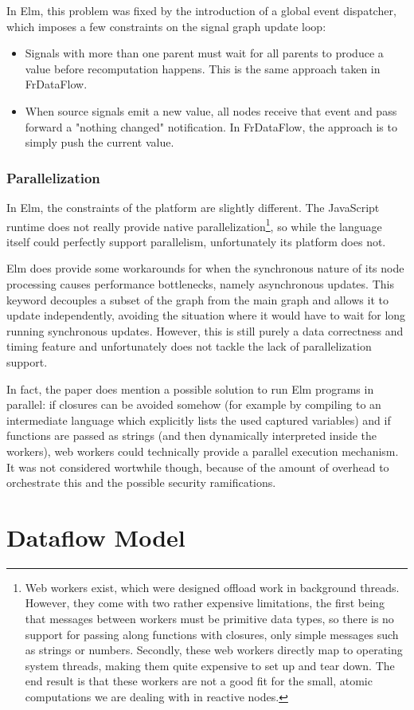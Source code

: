 In Elm, this problem was fixed by the introduction of a global event dispatcher, which imposes a few constraints on the signal graph update loop:

\begin{itemize}
	\item Signals with more than one parent must wait for all parents to produce a value before recomputation happens. This is the same approach taken in FrDataFlow. 
	\item When source signals emit a new value, all nodes receive that event and pass forward a "nothing changed" notification. In FrDataFlow, the approach is to simply push the current value. 
\end{itemize}


\subsubsection{Parallelization}

In Elm, the constraints of the platform are slightly different. The JavaScript runtime does not really provide native parallelization\footnote{Web workers exist, which were designed offload work in background threads. However, they come with two rather expensive limitations, the first being that messages between workers must be primitive data types, so there is no support for passing along functions with closures, only simple messages such as strings or numbers. Secondly, these web workers directly map to operating system threads, making them quite expensive to set up and tear down. The end result is that these workers are not a good fit for the small, atomic computations we are dealing with in reactive nodes.}, so while the language itself could perfectly support parallelism, unfortunately its platform does not. 

Elm does provide some workarounds for when the synchronous nature of its node processing causes performance bottlenecks, namely asynchronous updates. This keyword decouples a subset of the graph from the main graph and allows it to update independently, avoiding the situation where it would have to wait for long running synchronous updates. However, this is still purely a data correctness and timing feature and unfortunately does not tackle the lack of parallelization support.

In fact, the paper does mention a possible solution to run Elm programs in parallel: if closures can be avoided somehow (for example by compiling to an intermediate language which explicitly lists the used captured variables) and if functions are passed as strings (and then dynamically interpreted inside the workers), web workers could technically provide a parallel execution mechanism. It was not considered wortwhile though, because of the amount of overhead to orchestrate this and the possible security ramifications.


\section{Dataflow Model}



